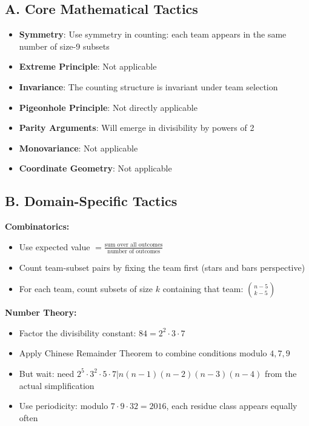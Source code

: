 \documentclass[]{article}
\begin{document}
	\begin{tacticalbox}
		\subsection*{A. Core Mathematical Tactics}
		\begin{itemize}[leftmargin=*]
			\item \textbf{Symmetry}: Use symmetry in counting: each team appears in the same number of size-9 subsets
			\item \textbf{Extreme Principle}: Not applicable
			\item \textbf{Invariance}: The counting structure is invariant under team selection
			\item \textbf{Pigeonhole Principle}: Not directly applicable
			\item \textbf{Parity Arguments}: Will emerge in divisibility by powers of 2
			\item \textbf{Monovariance}: Not applicable
			\item \textbf{Coordinate Geometry}: Not applicable
		\end{itemize}
		
		\subsection*{B. Domain-Specific Tactics}
		
		\textbf{Combinatorics:}
		\begin{itemize}[nosep]
			\item Use expected value $= \frac{\text{sum over all outcomes}}{\text{number of outcomes}}$
			\item Count team-subset pairs by fixing the team first (stars and bars perspective)
			\item For each team, count subsets of size $k$ containing that team: $\binom{n-5}{k-5}$
		\end{itemize}
		
		\textbf{Number Theory:}
		\begin{itemize}[nosep]
			\item Factor the divisibility constant: $84 = 2^2 \cdot 3 \cdot 7$
			\item Apply Chinese Remainder Theorem to combine conditions modulo $4, 7, 9$
			\item But wait: need $2^5 \cdot 3^2 \cdot 5 \cdot 7 | n(n-1)(n-2)(n-3)(n-4)$ from the actual simplification
			\item Use periodicity: modulo $7 \cdot 9 \cdot 32 = 2016$, each residue class appears equally often
		\end{itemize}
		

\end{tacticalbox}
\end{document}
